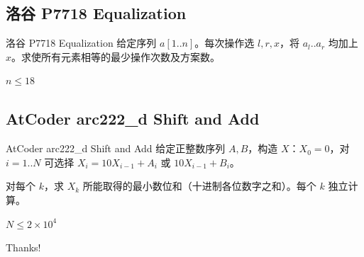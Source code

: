 ﻿\documentclass[aspectratio=169]{ctexbeamer}
\begin{document}
\subsection{洛谷 P7718 Equalization}
\begin{frame}{洛谷 P7718 Equalization}
    给定序列 $a[1..n]$。每次操作选 $l,r,x$，将 $a_l..a_r$ 均加上 $x$。求使所有元素相等的最少操作次数及方案数。
    
    $n\le 18$
\end{frame}

\subsection{AtCoder arc222\_d Shift and Add}
\begin{frame}{AtCoder arc222\_d Shift and Add}
    给定正整数序列 $A,B$，构造 $X$：$X_0=0$，对 $i=1..N$ 可选择 $X_i=10X_{i-1}+A_i$ 或 $10X_{i-1}+B_i$。
    
    对每个 $k$，求 $X_k$ 所能取得的最小数位和（十进制各位数字之和）。每个 $k$ 独立计算。
    
    $N\le 2\times10^4$
\end{frame}



\begin{frame}
    \begin{center}
        {\Huge\calligra Thanks!}
    \end{center}
\end{frame}
\end{document}
